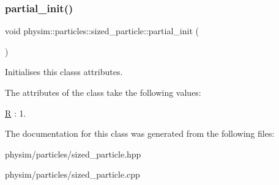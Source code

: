 \subsubsection{\texorpdfstring{partial\+\_\+init()}{partial\_init()}}
{\footnotesize\ttfamily void physim\+::particles\+::sized\+\_\+particle\+::partial\+\_\+init (\begin{DoxyParamCaption}{ }\end{DoxyParamCaption})\hspace{0.3cm}{\ttfamily [private]}}



Initialises this class\textquotesingle{}s attributes. 

The attributes of the class take the following values\+:
\begin{DoxyItemize}
\item \hyperlink{classphysim_1_1particles_1_1sized__particle_ac67d5df84b91bb12152c8691dd43e98c}{R} \+: 1. 
\end{DoxyItemize}

The documentation for this class was generated from the following files\+:\begin{DoxyCompactItemize}
\item 
physim/particles/sized\+\_\+particle.\+hpp\item 
physim/particles/sized\+\_\+particle.\+cpp\end{DoxyCompactItemize}
